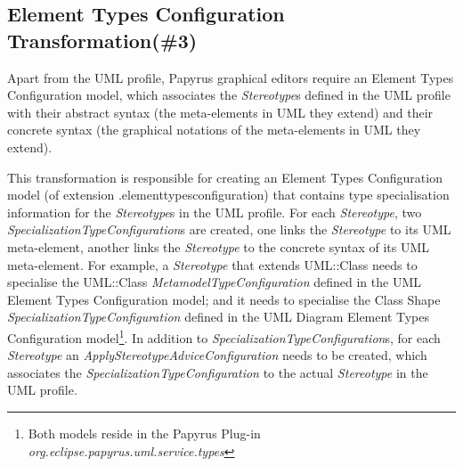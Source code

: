 \subsection{Element Types  Configuration Transformation(\#3)}
\label{sec:elementTypes}
Apart from the UML profile, Papyrus graphical editors require an Element Types Configuration model, which associates the \textit{Stereotype}s defined in the UML profile with their abstract syntax (the meta-elements in UML they extend) and their concrete syntax (the graphical notations of the meta-elements in UML they extend). 

This transformation is responsible for creating an Element Types Configuration model (of extension .elementtypesconfiguration) that contains type specialisation information for the \textit{Stereotype}s in the UML profile. 
For each \textit{Stereotype}, two \textit{SpecializationTypeConfiguration}s are created, one links the \textit{Stereotype} to its UML meta-element, another links the \textit{Stereotype} to the concrete syntax of its UML meta-element.
For example, a \textit{Stereotype} that extends UML::Class needs to specialise the UML::Class \textit{MetamodelTypeConfiguration} defined in the UML Element Types Configuration model; and it needs to specialise the Class Shape \textit{SpecializationTypeConfiguration} defined in the UML Diagram Element Types Configuration model\footnote{Both models reside in the Papyrus Plug-in \textit{org.eclipse.papyrus.uml.service.types}}. 
In addition to \textit{SpecializationTypeConfiguration}s, for each \textit{Stereotype} an \textit{ApplyStereotypeAdviceConfiguration} needs to be created, which associates the \textit{SpecializationTypeConfiguration} to the actual \textit{Stereotype} in the UML profile.


